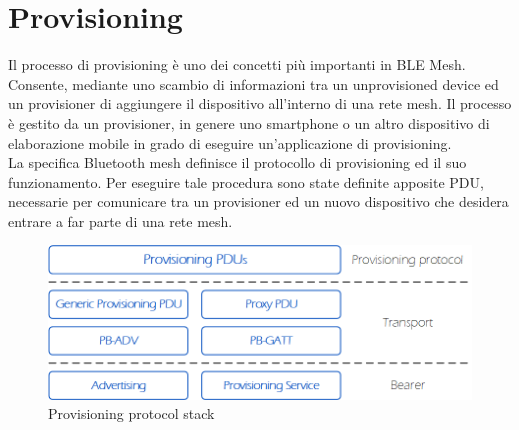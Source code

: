 \section{Provisioning}
\label{sec:provisioning}
Il processo di provisioning è uno dei concetti più importanti in BLE Mesh. Consente, mediante uno scambio di informazioni tra un unprovisioned device ed un provisioner di aggiungere il dispositivo all'interno di una rete mesh. Il processo è gestito da un provisioner, in genere uno smartphone o un altro dispositivo di elaborazione mobile in grado di eseguire un'applicazione di provisioning.\\
La specifica Bluetooth mesh definisce il protocollo di provisioning ed il suo funzionamento. Per eseguire tale procedura sono state definite apposite PDU, necessarie per comunicare tra un provisioner ed un nuovo dispositivo che desidera entrare a far parte di una rete mesh.

\begin{figure}[!ht]
    \centering
    \includegraphics[width = \textwidth]{images/Provisioning_architecture.png}
    \caption{Provisioning protocol stack}
    \label{fig:provisioning_stack}
\end{figure}

